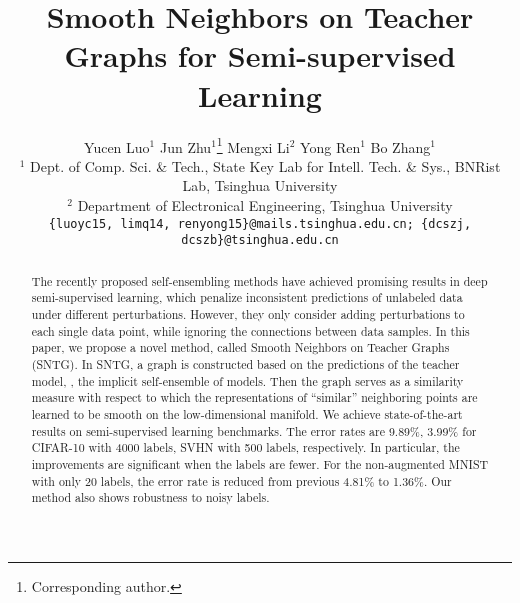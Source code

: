 \documentclass[10pt,twocolumn,letterpaper]{article}
\begin{document}
\title{Smooth Neighbors on Teacher Graphs for Semi-supervised Learning}

\author{
	Yucen Luo$^{1}$ \hspace{1.2cm}
	Jun Zhu$^{1}$\thanks{Corresponding author.} \hspace{1.2cm}
	Mengxi Li$^{2}$ \hspace{1.2cm}
	Yong Ren$^{1}$ \hspace{1.2cm}
	Bo Zhang$^{1}$\\
	$^{1}$ Dept. of Comp. Sci. \& Tech., State Key Lab for Intell. Tech. \& Sys., BNRist Lab, Tsinghua University\\
	$^{2}$ Department of Electronical Engineering, Tsinghua University\\
	{\tt\small \{luoyc15, limq14, renyong15\}@mails.tsinghua.edu.cn; \{dcszj, dcszb\}@tsinghua.edu.cn}}
\maketitle
\thispagestyle{empty}

\begin{abstract}
	The recently proposed self-ensembling methods have achieved promising results in deep semi-supervised learning, which penalize inconsistent predictions of unlabeled data under different perturbations. However, they only consider adding perturbations to each single data point, while ignoring the connections between data samples.
	In this paper, we propose a novel method, called Smooth Neighbors on Teacher Graphs (SNTG). In SNTG,
	a graph is constructed based on the predictions of the teacher model, \ie, the implicit self-ensemble of models. Then the graph serves as a similarity measure with respect to which the representations of ``similar'' neighboring points are learned to be smooth on the low-dimensional manifold. We achieve state-of-the-art results on semi-supervised learning benchmarks. The error rates are 9.89\%, 3.99\% for CIFAR-10 with 4000 labels, SVHN with 500 labels, respectively. In particular, the improvements are significant when the labels are fewer. For the non-augmented MNIST with only 20 labels, the error rate is reduced from previous 4.81\% to 1.36\%. Our method also shows robustness to noisy labels.
\end{abstract}
\vspace{-0.2cm}
\end{document}
